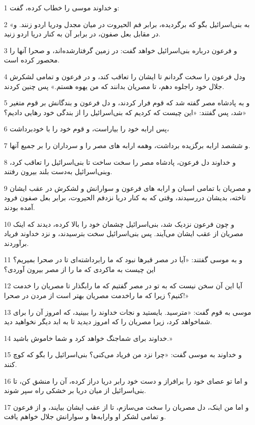 \par 1 و خداوند موسی را خطاب کرده، گفت:
\par 2 «به بنی‌اسرائیل بگو که برگردیده، برابر فم الحیروت در میان مجدل ودریا اردو زنند. و در مقابل بعل صفون، در برابر آن به کنار دریا اردو زنید.
\par 3 و فرعون درباره بنی‌اسرائیل خواهد گفت: در زمین گرفتارشده‌اند، و صحرا آنها را محصور کرده است.
\par 4 ودل فرعون را سخت گردانم تا ایشان را تعاقب کند، و در فرعون و تمامی لشکرش جلال خود راجلوه دهم، تا مصریان بدانند که من یهوه هستم.» پس چنین کردند.
\par 5 و به پادشاه مصر گفته شد که قوم فرار کردند، و دل فرعون و بندگانش بر قوم متغیر شد، پس گفتند: «این چیست که کردیم که بنی‌اسرائیل را از بندگی خود رهایی دادیم؟»
\par 6 پس ارابه خود را بیاراست، و قوم خود را با خودبرداشت،
\par 7 و ششصد ارابه برگزیده برداشت، وهمه ارابه های مصر را و سرداران را بر جمیع آنها.
\par 8 و خداوند دل فرعون، پادشاه مصر را سخت ساخت تا بنی‌اسرائیل را تعاقب کرد، وبنی‌اسرائیل به‌دست بلند بیرون رفتند.
\par 9 و مصریان با تمامی اسبان و ارابه های فرعون و سوارانش و لشکرش در عقب ایشان تاخته، بدیشان دررسیدند، وقتی که به کنار دریا نزدفم الحیروت، برابر بعل صفون فرود آمده بودند.
\par 10 و چون فرعون نزدیک شد، بنی‌اسرائیل چشمان خود را بالا کرده، دیدند که اینک مصریان از عقب ایشان می‌آیند. پس بنی‌اسرائیل سخت بترسیدند، و نزد خداوند فریاد برآوردند.
\par 11 و به موسی گفتند: «آیا در مصر قبرها نبود که ما رابرداشته‌ای تا در صحرا بمیریم؟ این چیست به ماکردی که ما را از مصر بیرون آوردی؟
\par 12 آیا این آن سخن نیست که به تو در مصر گفتیم که ما رابگذار تا مصریان را خدمت کنیم؟ زیرا که ما راخدمت مصریان بهتر است از مردن در صحرا!»
\par 13 موسی به قوم گفت: «مترسید. بایستید و نجات خداوند را ببینید، که امروز آن را برای شماخواهد کرد، زیرا مصریان را که امروز دیدید تا به ابد دیگر نخواهید دید.
\par 14 خداوند برای شماجنگ خواهد کرد و شما خاموش باشید.»
\par 15 و خداوند به موسی گفت: «چرا نزد من فریاد می‌کنی؟ بنی‌اسرائیل را بگو که کوچ کنند.
\par 16 و اما تو عصای خود را برافراز و دست خود رابر دریا دراز کرده، آن را منشق کن، تا بنی‌اسرائیل از میان دریا بر خشکی راه سپر شوند.
\par 17 و اما من اینک، دل مصریان را سخت می‌سازم، تا از عقب ایشان بیایند، و از فرعون و تمامی لشکر او وارابه‌ها و سوارانش جلال خواهم یافت.

